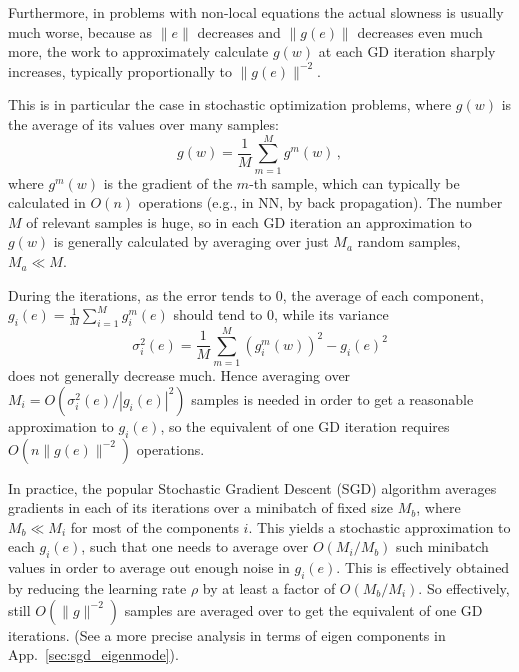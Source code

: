 \documentclass{article} %
\begin{document}
Furthermore, in problems with non-local equations the actual slowness is usually much worse, because as $\|e\|$ decreases and $\|g(e)\|$ decreases even much more, the work to approximately calculate $g(w)$ at each GD iteration sharply increases, typically proportionally to $\|g(e)\|^{-2}$.

This is in particular the case in stochastic optimization problems, where $g(w)$ is the average of its values over many samples:
$$
	g(w) = \frac{1}{M} \sum_{m=1}^M g^m(w)\,,
$$
where $g^m(w)$ is the gradient of the $m$-th sample, which can typically be calculated in $O(n)$ operations (e.g., in NN, by back propagation). The number $M$ of relevant samples is huge, so in each GD iteration an approximation to $g(w)$ is generally calculated by averaging over just $M_a$ random samples, $M_a \ll M$.

During the iterations, as the error tends to $0$, the average of each component, $g_i(e) = \frac{1}{M} \sum_{i=1}^M g_i^m(e)$ should tend to $0$, while its variance
$$
	\sigma_i^2(e) =  \frac{1}{M} \sum_{m=1}^M \left(g_i^m(w)\right)^2 - g_i(e)^2
$$
does not generally decrease much. Hence averaging over $M_i = O(\sigma_i^2(e) / |g_i(e)|^2)$ samples is needed in order to get a reasonable approximation to $g_i(e)$, so the equivalent of one GD iteration requires $O(n\|g(e)\|^{-2})$ operations.

In practice, the popular Stochastic Gradient Descent (SGD) algorithm averages gradients in each of its iterations over a minibatch of fixed size $M_b$, where $M_b \ll M_i$ for most of the components $i$. This yields a stochastic approximation to each $g_i(e)$, such that one needs to average over $O(M_i/M_b)$ such minibatch values in order to average out enough noise in $g_i(e)$. This is effectively obtained by reducing the learning rate $\rho$ by at least a factor of $O(M_b/M_i)$. So effectively, still $O(\|g\|^{-2})$ samples are averaged over to get the equivalent of one GD iterations. (See a more precise analysis in terms of eigen components in App.~\ref{sec:sgd_eigenmode}).


\end{document}

